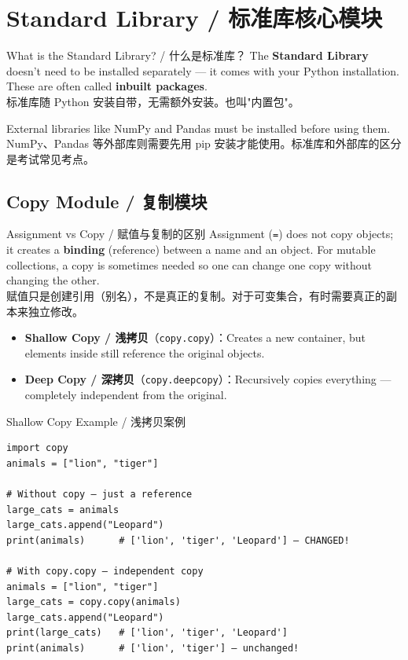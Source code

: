 \documentclass[11pt,a4paper]{report}
\let\oldtexttt\texttt
\renewcommand{\texttt}[1]{\textcolor{mainblue}{\oldtexttt{#1}}}
\begin{document}
\section{Standard Library / 标准库核心模块}

\begin{concept}{What is the Standard Library? / 什么是标准库？}
    The \textbf{Standard Library} doesn't need to be installed separately — it comes with your Python installation. These are often called \textbf{inbuilt packages}. \\
    标准库随 Python 安装自带，无需额外安装。也叫"内置包"。

    External libraries like NumPy and Pandas must be installed before using them. \\
    NumPy、Pandas 等外部库则需要先用 pip 安装才能使用。标准库和外部库的区分是考试常见考点。
\end{concept}

\subsection{Copy Module / 复制模块}

\begin{concept}{Assignment vs Copy / 赋值与复制的区别}
    Assignment (\texttt{=}) does not copy objects; it creates a \textbf{binding} (reference) between a name and an object. For mutable collections, a copy is sometimes needed so one can change one copy without changing the other. \\
    赋值只是创建引用（别名），不是真正的复制。对于可变集合，有时需要真正的副本来独立修改。

    \begin{itemize}[itemsep=0.5em]
        \item \textbf{Shallow Copy / 浅拷贝}（\texttt{copy.copy}）：Creates a new container, but elements inside still reference the original objects.
        \item \textbf{Deep Copy / 深拷贝}（\texttt{copy.deepcopy}）：Recursively copies everything — completely independent from the original.
    \end{itemize}
\end{concept}

\begin{examplebox}{Shallow Copy Example / 浅拷贝案例}
\begin{lstlisting}
import copy
animals = ["lion", "tiger"]

# Without copy — just a reference
large_cats = animals
large_cats.append("Leopard")
print(animals)      # ['lion', 'tiger', 'Leopard'] — CHANGED!

# With copy.copy — independent copy
animals = ["lion", "tiger"]
large_cats = copy.copy(animals)
large_cats.append("Leopard")
print(large_cats)   # ['lion', 'tiger', 'Leopard']
print(animals)      # ['lion', 'tiger'] — unchanged!
\end{lstlisting}
\end{examplebox}
\end{document}
